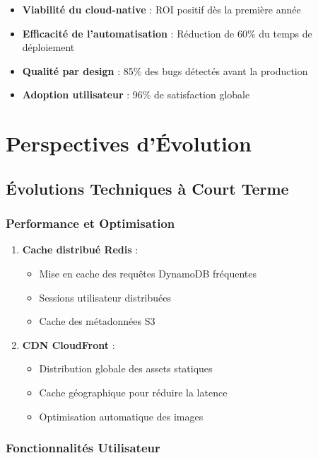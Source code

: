 \begin{itemize}
    \item \textbf{Viabilité du cloud-native} : ROI positif dès la première année
    \item \textbf{Efficacité de l'automatisation} : Réduction de 60\% du temps de déploiement
    \item \textbf{Qualité par design} : 85\% des bugs détectés avant la production
    \item \textbf{Adoption utilisateur} : 96\% de satisfaction globale
\end{itemize}

\section{Perspectives d'Évolution}

\subsection{Évolutions Techniques à Court Terme}

\subsubsection{Performance et Optimisation}

\begin{enumerate}
    \item \textbf{Cache distribué Redis} :
    \begin{itemize}
        \item Mise en cache des requêtes DynamoDB fréquentes
        \item Sessions utilisateur distribuées
        \item Cache des métadonnées S3
    \end{itemize}
    
    \item \textbf{CDN CloudFront} :
    \begin{itemize}
        \item Distribution globale des assets statiques
        \item Cache géographique pour réduire la latence
        \item Optimisation automatique des images
    \end{itemize}
\end{enumerate}

\subsubsection{Fonctionnalités Utilisateur}

